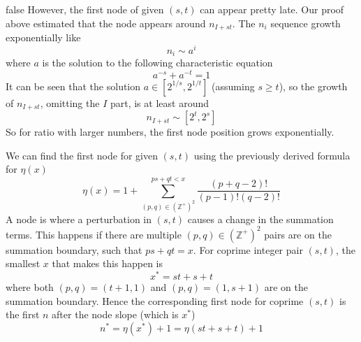 \documentclass[]{article}
\begin{document}
\if false
However, the first node of given $(s, t)$ can appear pretty late. Our proof above estimated that the node appears around $n_{I+st}$. The $n_i$ sequence growth exponentially like 
\[
n_i \sim a^i
\]
where $a$ is the solution to the following characteristic equation
\[
a^{-s} + a^{-t} = 1
\]
It can be seen that the solution $a \in [2^{1/s}, 2^{1/t}]$ (assuming $s \geq t$), so the growth of $n_{I+st}$, omitting the $I$ part, is at least around 
\[
n_{I+st} \sim  [2^t, 2^s]
\]
So for ratio with larger numbers, the first node position grows exponentially.
\fi

We can find the first node for given $(s, t)$ using the previously derived formula for $\eta(x)$
\[
\eta(x) = 1 + \sum_{(p,q)\in(\mathbb{Z}^+)^2}^{ps+qt<x}\frac{(p+q-2)!}{(p-1)!(q-2)!} 
\]
A node is where a perturbation in $(s, t)$ causes a change in the summation terms. This happens if there are multiple $(p,q)\in(\mathbb{Z}^+)^2$ pairs are on the summation boundary, such that $ps+qt = x$. For coprime integer pair $(s, t)$, the smallest $x$ that makes this happen is
\[
x^* = st + s + t
\]
where both $(p,q) = (t+1, 1)$ and $(p,q) = (1, s+1)$ are on the summation boundary. Hence the corresponding first node for coprime $(s,t)$ is the first $n$ after the node slope (which is $x^*$)
\[
n^* = \eta(x^*) + 1 = \eta(st + s + t) + 1
\]
\end{document}
